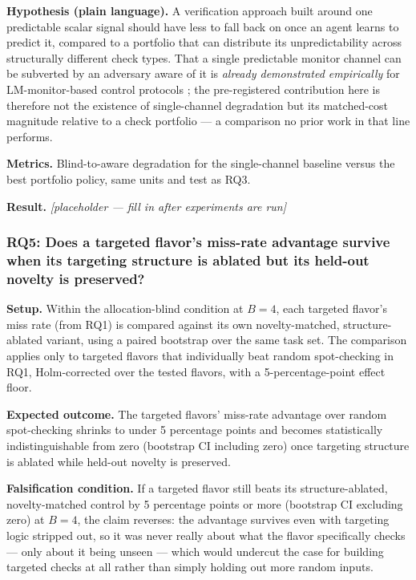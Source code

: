 \documentclass[11pt]{article}
\newcommand{\ph}{\textit{[placeholder --- fill in after experiments are run]}}
\begin{document}
\textbf{Hypothesis (plain language).} A verification approach built around one predictable scalar signal should have less to fall back on once an agent learns to predict it, compared to a portfolio that can distribute its unpredictability across structurally different check types. That a single predictable monitor channel can be subverted by an adversary aware of it is \emph{already demonstrated empirically} for LM-monitor-based control protocols \citep{AdaptiveAttacksMonitors2025}; the pre-registered contribution here is therefore not the existence of single-channel degradation but its matched-cost magnitude relative to a check portfolio --- a comparison no prior work in that line performs.

\textbf{Metrics.} Blind-to-aware degradation for the single-channel baseline versus the best portfolio policy, same units and test as RQ3.

\textbf{Result.} \ph

\subsubsection{RQ5: Does a targeted flavor's miss-rate advantage survive when its targeting structure is ablated but its held-out novelty is preserved?}
\textbf{Setup.} Within the allocation-blind condition at $B=4$, each targeted flavor's miss rate (from RQ1) is compared against its own novelty-matched, structure-ablated variant, using a paired bootstrap over the same task set. The comparison applies only to targeted flavors that individually beat random spot-checking in RQ1, Holm-corrected over the tested flavors, with a 5-percentage-point effect floor.

\textbf{Expected outcome.} The targeted flavors' miss-rate advantage over random spot-checking shrinks to under 5 percentage points and becomes statistically indistinguishable from zero (bootstrap CI including zero) once targeting structure is ablated while held-out novelty is preserved.

\textbf{Falsification condition.} If a targeted flavor still beats its structure-ablated, novelty-matched control by 5 percentage points or more (bootstrap CI excluding zero) at $B=4$, the claim reverses: the advantage survives even with targeting logic stripped out, so it was never really about what the flavor specifically checks --- only about it being unseen --- which would undercut the case for building targeted checks at all rather than simply holding out more random inputs.
\end{document}
